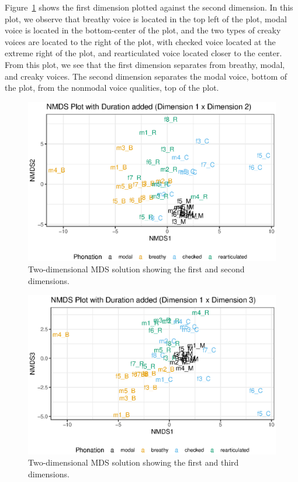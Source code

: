 Figure~\ref{fig:nmds12} shows the first dimension plotted against the second dimension. In  this plot, we observe that breathy voice is located in the top left of the plot, modal voice is located in the bottom-center of the plot, and the two types of creaky voices are located to the right of the plot, with checked voice located at the extreme right of the plot, and rearticulated voice located closer to the center. From this plot, we see that the first dimension separates from breathy, modal, and creaky voices. The second dimension separates the modal voice, bottom of the plot, from the nonmodal voice qualities, top of the plot.

\begin{figure}[!ht]
    \centering
    \includegraphics[width = 0.9\linewidth]{images/MDS/nmds12_dur.eps}
    \caption{Two-dimensional MDS solution showing the first and second dimensions.}
    \label{fig:nmds12}
\end{figure}

\begin{figure}[!h]
    \centering
    \includegraphics[width = 0.9\linewidth]{images/MDS/nmds13_dur.eps}
    \caption{Two-dimensional MDS solution showing the first and third dimensions.}
    \label{fig:nmds13}
\end{figure}

